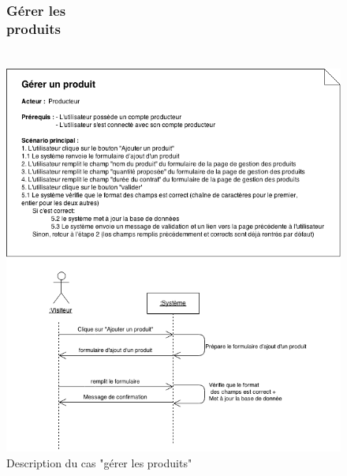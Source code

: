 \documentclass[12pt]{report}
\begin{document}
\begin{figure}[!h]
\centering
\subsubsection{Gérer les produits~~~~~~~~~~~~~~~~~~~~~~~~~~~~~~~~~~~~~~~}
\includegraphics[width=1.\textwidth]{./ressources/desc_UC_gerer_produit.png}
\caption{Description du cas "gérer les produits"}
\end{figure}
\clearpage
\end{document}
